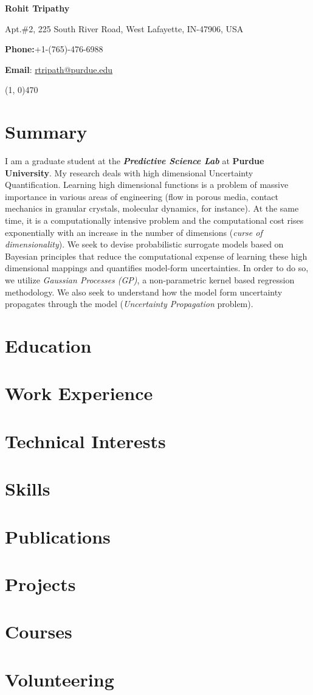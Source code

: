 \documentclass[11pt]{article}
\begin{document}
\centerline{\LARGE \textbf{Rohit Tripathy}}
\centerline{Apt.\#2, 225 South River Road, West Lafayette, IN-47906, USA}
\centerline{\textbf{Phone:}+1-(765)-476-6988}
\centerline{\textbf{Email}: \href{mailto:rtripath@purdue.edu}{rtripath@purdue.edu}}

\line(1, 0){470}


\section*{Summary}
I am a graduate student at the \textit{\textbf{Predictive Science Lab}} at \textbf{Purdue University}. My research deals with high dimensional Uncertainty Quantification. Learning high dimensional functions is a problem of massive importance in various areas of engineering (flow in porous media, contact mechanics in granular crystals, molecular dynamics, for instance). At the same time, it is a computationally intensive problem and the computational cost rises exponentially with an increase in the number of dimensions (\textit{curse of dimensionality}). We seek to devise probabilistic surrogate models based on Bayesian principles that reduce the computational expense of learning these high dimensional mappings and quantifies model-form uncertainties. In order to do so, we utilize \textit{Gaussian Processes (GP)}, a non-parametric kernel based regression methodology. We also seek to understand how the model form uncertainty propagates through the model (\textit{Uncertainty Propagation} problem).

\section*{Education}


\section*{Work Experience}

\section*{Technical Interests}
\section*{Skills}
\section*{Publications}
\section*{Projects}
\section*{Courses}
\section*{Volunteering}
\end{document}
